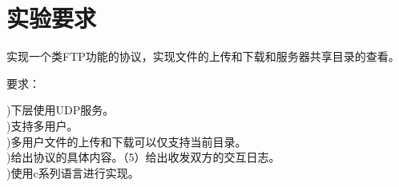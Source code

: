 \section*{ \centering 实验要求}
\vskip1.0cm

实现一个类FTP功能的协议，实现文件的上传和下载和服务器共享目录的查看。

要求：
\begin{flushleft}

)下层使用UDP服务。\\

)支持多用户。\\

)多用户文件的上传和下载可以仅支持当前目录。\\

)给出协议的具体内容。（5）给出收发双方的交互日志。\\

)使用c系列语言进行实现。\\
\end{flushleft}
\clearpage




